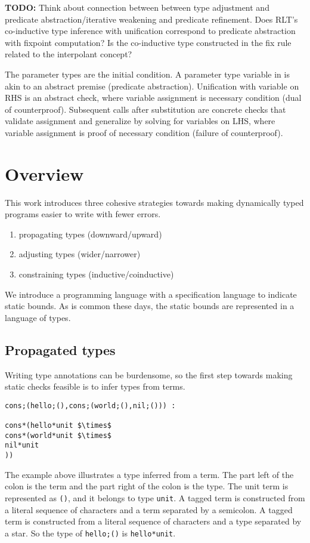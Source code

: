 \documentclass[sigplan]{acmart}
\theoremstyle{definition}
\begin{document}
\textbf{TODO:} Think about connection between between type adjustment and predicate abstraction/iterative weakening and predicate refinement.
Does RLT's co-inductive type inference with unification correspond to predicate abstraction with fixpoint computation? 
Is the co-inductive type constructed in the fix rule related to the interpolant concept?

The parameter types are the initial condition. 
A parameter type variable in is akin to an abstract premise (predicate abstraction). 
Unification with variable on RHS is an abstract check, where variable assignment 
is necessary condition (dual of counterproof). 
Subsequent calls after substitution are concrete checks that validate assignment 
and generalize by solving for variables on LHS, 
where variable assignment is proof of necessary condition (failure of counterproof).
\newline


\section{Overview}

This work introduces three cohesive strategies towards making
dynamically typed programs easier to write with fewer errors.  
\begin{enumerate}
  \item propagating types (downward/upward) 
  \item adjusting types (wider/narrower) 
  \item constraining types (inductive/coinductive) 
\end{enumerate}
We introduce a programming language with a specification language to indicate static bounds. 
As is common these days, the static bounds are represented in a language of types.

\subsection{Propagated types}
Writing type annotations can be burdensome, so the first step 
towards making static checks feasible is to infer types from terms.

\begin{lstlisting}
cons;(hello;(),cons;(world;(),nil;())) : 

cons*(hello*unit $\times$ 
cons*(world*unit $\times$ 
nil*unit
))
\end{lstlisting}

\noindent The example above illustrates a type inferred from a term.
The part left of the colon is the term and the part right of the colon is the type.
The unit term is represented as \lstinline{()}, and it belongs to type \lstinline{unit}. 
A tagged term is constructed from a literal sequence of characters and a term separated
by a semicolon. A tagged term is constructed from a literal sequence of characters
and a type separated by a star.
So the type of \lstinline{hello;()} is \lstinline{hello*unit}.
\end{document}

